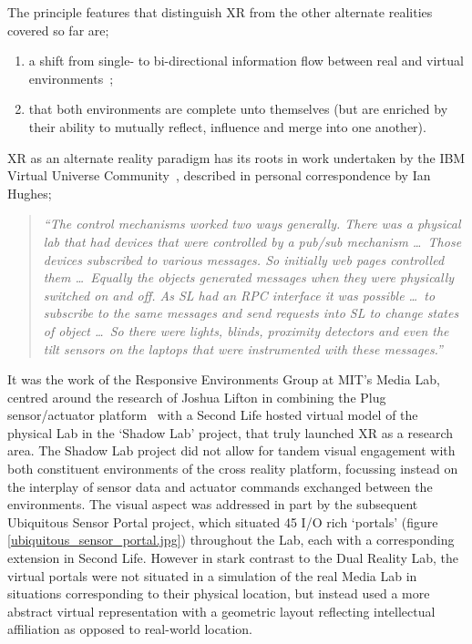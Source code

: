 The principle features that distinguish XR from the other alternate realities covered so far are;
\begin{enumerate}
	\item a shift from single- to bi-directional information flow between real and virtual environments~\cite{kim:practical};
	\item that both environments are complete unto themselves (but are enriched by their ability to mutually reflect, influence and merge into one another).~\cite{lifton:merging}
\end{enumerate}


XR as an alternate reality paradigm has its roots in work undertaken by the IBM Virtual Universe Community~\cite{Hughes2006, Hughes2006a,Hughes2006b}, described in personal correspondence by Ian Hughes;

\begin{quote}
\textit{``The control mechanisms worked two ways generally. There was a physical lab that had devices that were controlled by a pub/sub mechanism \ldots\ Those devices subscribed to various messages. So initially web pages controlled them \ldots\ Equally the objects generated messages when they were physically switched on and off. As SL\SLfootnote{} had an RPC interface it was possible \ldots\ to subscribe to the same messages and send requests into SL to change states of object \ldots\ So there were lights, blinds, proximity detectors and even the tilt sensors on the laptops that were instrumented with these messages.''}
\end{quote}

It was the work of the Responsive Environments Group at MIT's Media Lab, centred around the research of Joshua Lifton in combining the Plug sensor/actuator platform~\cite{Lifton2007b} with a Second Life hosted virtual model of the physical Lab in the `Shadow Lab' project, that truly launched XR as a research area. The Shadow Lab project did not allow for tandem visual engagement with both constituent environments of the cross reality platform, focussing instead on the interplay of sensor data and actuator commands exchanged between the environments. The visual aspect was addressed in part by the subsequent Ubiquitous Sensor Portal project, which situated 45 I/O rich `portals' (figure \ref{ubiquitous_sensor_portal.jpg}) throughout the Lab, each with a corresponding extension in Second Life. However in stark contrast to the Dual Reality Lab, the virtual portals were not situated in a simulation of the real Media Lab in situations corresponding to their physical location, but instead used a more abstract virtual representation with a geometric layout reflecting intellectual affiliation as opposed to real-world location.

